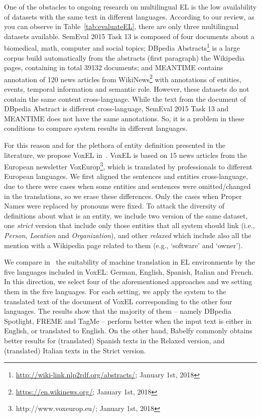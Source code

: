 \documentclass[sigconf]{acmart}
\begin{document}
One of the obstacles to ongoing research on multilingual EL is the low availability of datasets with the same text in different languages. According to our review, as you can observe in Table~\ref{tab:evaluateEL}, there are only three multilingual datasets available. SemEval 2015 Task 13 is composed of four documents about a biomedical, math, computer and social topics; DBpedia Abstracts\footnote{\url{http://wiki-link.nlp2rdf.org/abstracts/}; January 1st, 2018} is a large corpus build automatically from the abstracts (first paragraph) the Wikipedia pages, containing in total 39132 documents; and MEANTIME contains annotation of 120 news articles from WikiNews\footnote{\url{https://en.wikinews.org/}; January 1st, 2018} with annotations of entities, events, temporal information and semantic role. However, these datasets do not contain the same content cross-language. While the text from the document of DBpedia Abstract is different cross-language, SemEval 2015 Task 13 and MEANTIME does not have the same annotations. So, it is a problem in these conditions to compare system results in different languages. 

For this reason and for the plethora of entity definition presented in the literature, we propose VoxEL in~\cite{VoxEL2018}. VoxEL is based on 15 news articles from the European newsletter VoxEurop\footnote{http://www.voxeurop.eu/; January 1st, 2018}, which is translated by professionals to different European languages. We first aligned the sentences and entities cross-language, due to there were cases when some entities and sentences were omitted/changed in the translations, so we erase these differences. Only the cases when Proper Names were replaced by pronouns were fixed. To attack the diversity of definitions about what is an entity, we include two version of the same dataset, one \textit{strict} version that include only those entities that all system should link (i.e., \textit{Person}, \textit{Location} and \textit{Organization}), and other \textit{relaxed} which include also all the mention with a Wikipedia page related to them (e.g., `software' and `owner'). 

We compare in~\cite{Rosales-MendezH18a} the suitability of machine translation in EL environments by the five languages included in VoxEL: German, English, Spanish, Italian and French. In this direction, we select four of the aforementioned approaches and we setting them in the five languages. For each setting, we apply the system to the translated text of the document of VoxEL corresponding to the other four languages. The results show that the majority of them -- namely DBpedia Spotlight, FREME and TagMe -- perform better when the input text is either in English, or translated to English. On the other hand, Babelfy commonly obtains better results for (translated) Spanish texts in the Relaxed version, and (translated) Italian
texts in the Strict version. 
\end{document}
